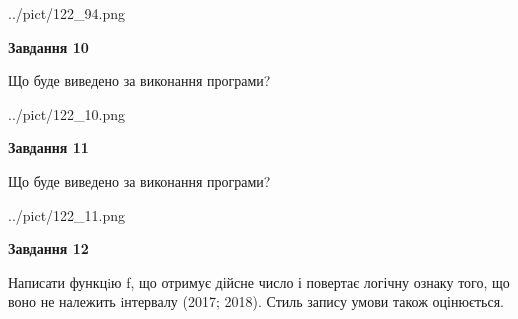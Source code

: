 \documentclass[12pt, ukrainian]{article}
\begin{document}
{\begin {large}
\begin{center}
	{../pict/122_94.png}
\end{center}
\newpage

{\begin {center}\textbf{Завдання 10}\end {center}}

Що буде виведено за виконання програми?\par
\begin{center}
	{../pict/122_10.png}
\end{center}
\newpage

{\begin {center}\textbf{Завдання 11}\end {center}}

Що буде виведено за виконання програми?\par
\begin{center}
	{../pict/122_11.png}
\end{center}
\newpage

{\begin {center}\textbf{Завдання 12}\end {center}}


Написати функцiю f, що отримує дійсне число і повертає логічну ознаку того, що воно не належить iнтервалу (2017; 2018). Стиль запису умови також оцінюється.\par
\newpage

\end {large}}
\end{document}
